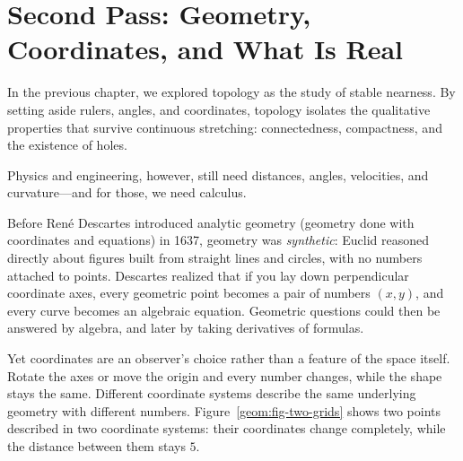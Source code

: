 \section{Second Pass: Geometry, Coordinates, and What Is Real}
\chapterline

In the previous chapter, we explored topology as the study of stable nearness. By setting aside rulers, angles, and coordinates, topology isolates the qualitative properties that survive continuous stretching: connectedness, compactness, and the existence of holes.

Physics and engineering, however, still need distances, angles, velocities, and curvature---and for those, we need calculus.

Before Ren\'e Descartes introduced analytic geometry (geometry done with coordinates and equations) in 1637, geometry was \emph{synthetic}: Euclid reasoned directly about figures built from straight lines and circles, with no numbers attached to points. Descartes realized that if you lay down perpendicular coordinate axes, every geometric point becomes a pair of numbers $(x, y)$, and every curve becomes an algebraic equation. Geometric questions could then be answered by algebra, and later by taking derivatives of formulas.

Yet coordinates are an observer's choice rather than a feature of the space itself. Rotate the axes or move the origin and every number changes, while the shape stays the same. Different coordinate systems describe the same underlying geometry with different numbers. Figure~\ref{geom:fig-two-grids} shows two points described in two coordinate systems: their coordinates change completely, while the distance between them stays $5$.


